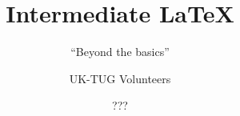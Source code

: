 \usepackage[T1]{fontenc}
\usepackage{babel,booktabs,csquotes,lmodern,tikz,verbatim}

\newcommand*\BibTeX{BibTeX}
\newcommand*\cls[1]{\textsf{#1}}
\newcommand*\cs[1]{\texttt{\char`\\#1}}
\newcommand*\marg[1]{\texttt{\char`\{#1\char`\}}}
\newcommand*\meta[1]{\ensuremath{\langle}\emph{#1}\ensuremath{\rangle}}
\newcommand*\oarg[1]{\texttt{[#1]}}
\newcommand*\pkg[1]{\textsf{#1}}

\renewcommand*\LaTeX{LaTeX}
\renewcommand*\LaTeXe{LaTeX2e}
\renewcommand*\TeX{TeX}

\title{Intermediate \LaTeX{}}
\subtitle{\enquote{Beyond the basics}}
\date{???}
\author{UK-TUG Volunteers}



\begin{frame}
  \titlepage
\end{frame}






